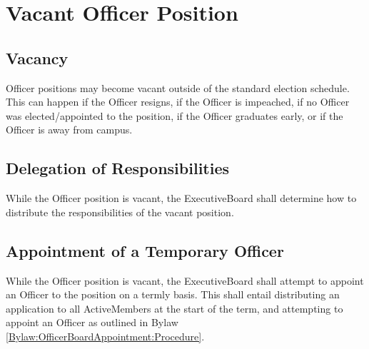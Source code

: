 \chapter{Vacant Officer Position}\label{Bylaw:VacantOfficerPosition}

\section{Vacancy}\label{Bylaw:VacantOfficerPosition:Vacancy}
	\Gls{Officer} positions may become vacant outside of the standard election schedule. This can happen if the \gls{Officer} resigns, if the \gls{Officer} is impeached, if no \gls{Officer} was elected/appointed to the position, if the \gls{Officer} graduates early, or if the \gls{Officer} is away from campus.

\section{Delegation of Responsibilities}
	While the \gls{Officer} position is vacant, the \gls{ExecutiveBoard} shall determine how to distribute the responsibilities of the vacant position.

\section{Appointment of a Temporary \Gls{Officer}}\label{Bylaw:VacantOfficerPosition:Appointment}
	While the \gls{Officer} position is vacant, the \gls{ExecutiveBoard} shall attempt to appoint an \gls{Officer} to the position on a termly basis. This shall entail distributing an application to all \glspl{ActiveMember} at the start of the term, and attempting to appoint an \gls{Officer} as outlined in \Gls{Bylaw} \ref{Bylaw:OfficerBoardAppointment:Procedure}.
